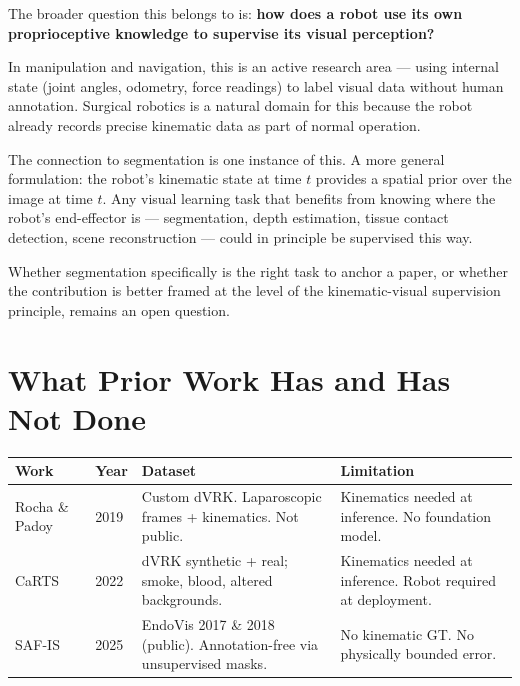 \documentclass[11pt, a4paper]{article}
\begin{document}
The broader question this belongs to is:
\textbf{how does a robot use its own proprioceptive knowledge to supervise
its visual perception?}

In manipulation and navigation, this is an active research area --- using
internal state (joint angles, odometry, force readings) to label visual
data without human annotation. Surgical robotics is a natural domain for
this because the robot already records precise kinematic data as part of
normal operation.

The connection to segmentation is one instance of this.
A more general formulation: the robot's kinematic state at time $t$ provides
a spatial prior over the image at time $t$. Any visual learning task that
benefits from knowing where the robot's end-effector is --- segmentation,
depth estimation, tissue contact detection, scene reconstruction ---
could in principle be supervised this way.

Whether segmentation specifically is the right task to anchor a paper,
or whether the contribution is better framed at the level of the
kinematic-visual supervision principle, remains an open question.

\section{What Prior Work Has and Has Not Done}

\begin{center}
\begin{tabular}{p{3cm} C{1.2cm} p{4.5cm} p{4cm}}
\toprule
\textbf{Work} & \textbf{Year} & \textbf{Dataset} & \textbf{Limitation} \\
\midrule
Rocha \& Padoy~\cite{rocha2019kinematic} & 2019 &
Custom dVRK. Laparoscopic frames + kinematics. Not public. &
Kinematics needed at inference. No foundation model. \\
CaRTS~\cite{ding2022carts} & 2022 &
dVRK synthetic + real; smoke, blood, altered backgrounds. &
Kinematics needed at inference. Robot required at deployment. \\
SAF-IS~\cite{sestini2025safis} & 2025 &
EndoVis 2017 \& 2018 (public). Annotation-free via unsupervised masks. &
No kinematic GT. No physically bounded error. \\
\bottomrule
\end{tabular}
\end{center}
\end{document}
